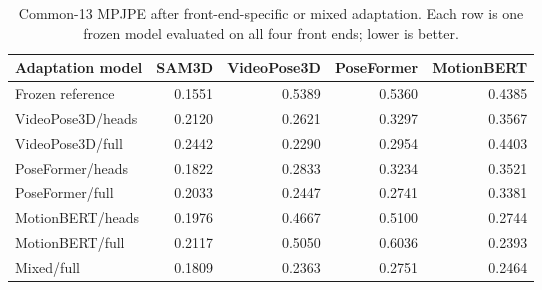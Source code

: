 \begin{table}[t]
\centering
\caption{Common-13 MPJPE after front-end-specific or mixed adaptation. Each row is one frozen model evaluated on all four front ends; lower is better.}
\label{tab:frontend_adaptation}
\small
\begin{tabular}{lrrrr}
\toprule
Adaptation model & SAM3D & VideoPose3D & PoseFormer & MotionBERT \\
\midrule
Frozen reference & 0.1551 & 0.5389 & 0.5360 & 0.4385 \\
\midrule
VideoPose3D/heads & 0.2120 & 0.2621 & 0.3297 & 0.3567 \\
VideoPose3D/full & 0.2442 & 0.2290 & 0.2954 & 0.4403 \\
PoseFormer/heads & 0.1822 & 0.2833 & 0.3234 & 0.3521 \\
PoseFormer/full & 0.2033 & 0.2447 & 0.2741 & 0.3381 \\
MotionBERT/heads & 0.1976 & 0.4667 & 0.5100 & 0.2744 \\
MotionBERT/full & 0.2117 & 0.5050 & 0.6036 & 0.2393 \\
Mixed/full & 0.1809 & 0.2363 & 0.2751 & 0.2464 \\
\bottomrule
\end{tabular}
\end{table}

